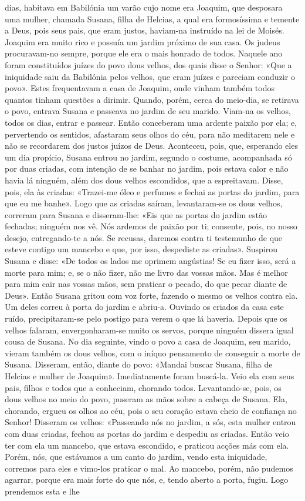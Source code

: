 \begin{paracol}{2}
{ dias, habitava em Babilónia um varão cujo nome era Joaquim, que desposara uma mulher, chamada Susana, filha de Helcias, a qual era formosíssima e temente a Deus, pois seus pais, que eram justos, haviam-na instruído na lei de Moisés. Joaquim era muito rico e possuía um jardim próximo de sua casa. Os judeus procuravam-no sempre, porque ele era o mais honrado de todos. Naquele ano foram constituídos juízes do povo dous velhos, dos quais disse o Senhor: «Que a iniquidade saiu da Babilónia pelos velhos, que eram juízes e pareciam conduzir o povo». Estes frequentavam a casa de Joaquim, onde vinham também todos quantos tinham questões a dirimir. Quando, porém, cerca do meio-dia, se retirava o povo, entrava Susana e passeava no jardim de seu marido. Viam-na os velhos, todos os dias, entrar e passear. Então conceberam uma ardente paixão por ela; e, pervertendo os sentidos, afastaram seus olhos do céu, para não meditarem nele e não se recordarem dos justos juízos de Deus. Aconteceu, pois, que, esperando eles um dia propício, Susana entrou no jardim, segundo o costume, acompanhada só por duas criadas, com intenção de se banhar no jardim, pois estava calor e não havia lá ninguém, além dos dous velhos escondidos, que a espreitavam. Disse, pois, ela às criadas: «Trazei-me óleo e perfumes e fechai as portas do jardim, para que eu me banhe». Logo que as criadas saíram, levantaram-se os dous velhos, correram para Susana e disseram-lhe: «Eis que as portas do jardim estão fechadas; ninguém nos vê. Nós ardemos de paixão por ti; consente, pois, no nosso desejo, entregando-te a nós. Se recusas, daremos contra ti testemunho de que esteve contigo um mancebo e que, por isso, despediste as criadas». Suspirou Susana e disse: «De todos os lados me oprimem angústias! Se eu fizer isso, será a morte para mim; e, se o não fizer, não me livro das vossas mãos. Mas é melhor para mim cair nas vossas mãos, sem praticar o pecado, do que pecar diante de Deus». Então Susana gritou com voz forte, fazendo o mesmo os velhos contra ela. Um deles correu à porta do jardim e abriu-a. Ouvindo os criados da casa este ruído, precipitaram-se pelo postigo para verem o que lá haveria. Depois que os velhos falaram, envergonharam-se muito os servos, porque ninguém dissera igual cousa de Susana. No dia seguinte, vindo o povo a casa de Joaquim, seu marido, vieram também os dous velhos, com o iníquo pensamento de conseguir a morte de Susana. Disseram, então, diante do povo: «Mandai buscar Susana, filha de Helcias e mulher de Joaquim». Imediatamente foram buscá-la. Veio ela com seus pais, filhos e todos que a conheciam, chorando todos. Levantando-se, pois, os dous velhos no meio do povo, puseram as mãos sobre a cabeça de Susana. Ela, chorando, ergueu os olhos ao céu, pois o seu coração estava cheio de confiança no Senhor! Disseram os velhos: «Passeando nós no jardim, a sós, esta mulher entrou com duas criadas, fechou as portas do jardim e despediu as criadas. Então veio ter com ela um mancebo, que estava escondido, e praticou acções más com ela. Porém, nós, que estávamos a um canto do jardim, vendo esta iniquidade, corremos para eles e vimo-los praticar o mal. Ao mancebo, porém, não pudemos agarrar, porque era mais forte do que nós, e, tendo aberto a porta, fugiu. Logo prendemos esta e lhe }
\end{paracol}
